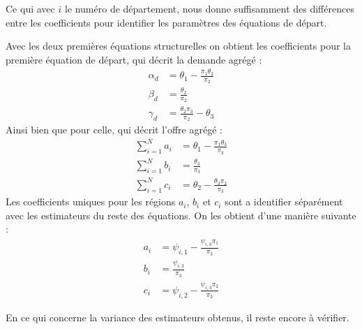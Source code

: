 \documentclass[11pt, a4paper]{article}
\begin{document}
Ce qui avec $i$ le numéro de département, nous donne suffisamment des différences entre les coefficients pour identifier les paramètres des équations de départ. 
\par
Avec les deux premières équations structurelles on obtient les coefficients pour la première équation de départ, qui décrit la demande agrégé :
\begin{align}
  \alpha_d & = \theta_1 - \frac{\pi_1 \theta_2}{\pi_2} \\
  \beta_d & = \frac{\theta_2}{\pi_2} \\
  \gamma_d & = \frac{\theta_2 \pi_3}{\pi_2} - \theta_3
\end{align}
Ainsi bien que pour celle, qui décrit l'offre agrégé :
\begin{align}
  \sum_{i = 1}^{N} a_i & = \theta_1 - \frac{\pi_1 \theta_3}{\pi_3} \\
  \sum_{i = 1}^{N} b_i & = \frac{\theta_3}{\pi_3} \\
  \sum_{i = 1}^{N} c_i & = \theta_2 - \frac{\theta_3 \pi_2}{\pi_3}
\end{align}
Les coefficients uniques pour les régions $a_i$, $b_i$ et $c_i$ sont a identifier séparément avec les estimateurs du reste des équations.
On les obtient d'une manière suivante :
\begin{align}
  a_i & = \psi_{i,1} - \frac{\psi_{i,3} \pi_1}{\pi_3} \\
  b_i & = \frac{\psi_{i,3}}{\pi_3} \\
  c_i & = \psi_{i,2} - \frac{\psi_{i,3} \pi_2}{\pi_3}
\end{align}
\par
En ce qui concerne la variance des estimateurs obtenus, il reste encore à vérifier.

\newpage
\end{document}
